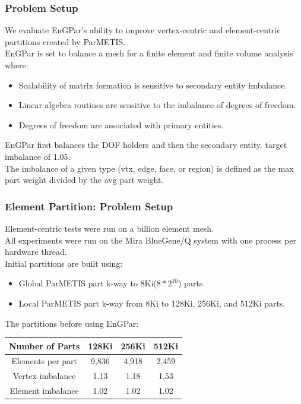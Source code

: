 \documentclass[aspectratio=169]{beamer}
\begin{document}
\begin{frame}
  \frametitle{Problem Setup}
  We evaluate EnGPar's ability to improve vertex-centric
  and element-centric partitions created by ParMETIS.\\
  \medskip
  EnGPar is set to balance a mesh for a finite element and finite volume analysis where:
  \begin{itemize}
    \item Scalability of matrix formation is sensitive to secondary entity imbalance.
    \item Linear algebra routines are sensitive to the imbalance of degrees of freedom.
    \item Degrees of freedom are associated with primary entities.
  \end{itemize}
  \bigskip
  EnGPar first balances the DOF holders and then the secondary entity.
  target imbalance of 1.05. \\
  The imbalance of a given type (vtx, edge, face, or region) is defined as the
  max part weight divided by the avg part weight.
\end{frame}

\begin{frame}
  \frametitle{Element Partition: Problem Setup}
  \medskip
  Element-centric tests were run on a billion element mesh. \\
  All experiments were run on the Mira BlueGene/Q system with one process per
  hardware thread. \\
  \smallskip
  Initial partitions are built using:
  \begin{itemize}
  \item Global ParMETIS part k-way to 8Ki($8*2^{10}$) parts.
  \item Local ParMETIS part k-way from 8Ki to 128Ki, 256Ki, and 512Ki parts.
  \end{itemize}
  The partitions before using EnGPar:\\
  \begin{table}[!h]
    \centering
    \begin{tabular}{||c|c|c|c||}
      \hline
      Number of Parts &128Ki&256Ki&512Ki \\
      \hline
      Elements per part & 9,836 & 4,918&2,459  \\
      \hline
      Vertex imbalance & 1.13 & 1.18 & 1.53 \\
      \hline
      Element imbalance & 1.02& 1.02& 1.02\\
      \hline
    \end{tabular}
  \end{table}
\end{frame}
\end{document}
